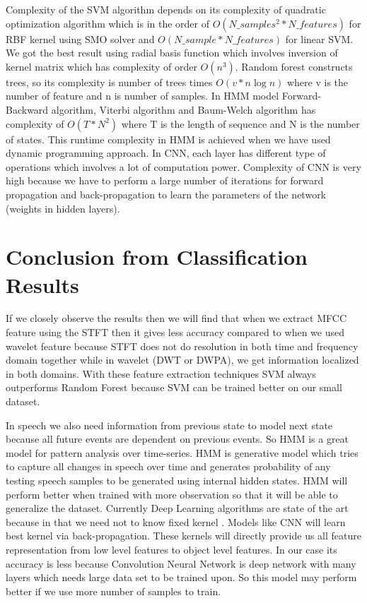 \documentclass[11pt]{report}
\begin{document}
Complexity of the SVM algorithm depends on its complexity of quadratic optimization algorithm which is in the order of  $O(N\_samples^2 * N\_features)$ for RBF kernel using SMO solver and $O(N\_sample * N\_features)$ for linear SVM. We got the best result using radial basis function which involves inversion of kernel matrix which has complexity of order $O(n^3)$. Random forest constructs trees, so its complexity is number of trees times $O(v*n \log{n})$ where v is the number of feature and n is number of samples.  In HMM model Forward-Backward algorithm, Viterbi algorithm and Baum-Welch algorithm  has complexity of $O(T * N^2)$ where T is the length of sequence and N is the number of states. This runtime complexity in HMM is achieved when we have used dynamic programming approach.
In CNN, each layer has different type of operations which involves a lot of computation power. Complexity of CNN is very high because we have to perform a large number of iterations for forward propagation and back-propagation to learn the parameters of the network (weights in hidden layers).


\section{Conclusion from  Classification Results}
If we closely observe the results then we will find that when we extract MFCC feature using the STFT then it gives less accuracy compared to when we used wavelet feature because STFT does not do resolution in both time and frequency domain together while in wavelet (DWT or DWPA), we get information localized in both domains. With these feature extraction techniques SVM always outperforms Random Forest because SVM can be trained better on our small dataset.


In speech we also need information from previous state to model next state because all future events are dependent on previous events. So HMM is a great model for pattern analysis over time-series. HMM is generative model which tries to capture all changes in speech over time and generates probability of any testing speech samples to be generated using internal hidden states. HMM will perform better when trained with more observation so that it will be able to generalize the dataset.  Currently Deep Learning algorithms are  state of the art because in that we need not to know fixed kernel . Models like CNN will learn best kernel via back-propagation. These kernels will directly provide us all feature representation from low level features to object level features. In our case its accuracy is less because Convolution Neural Network is deep network with many layers which needs large data set to be trained upon. So this model may perform better if we use more number of samples to train.
\end{document}
